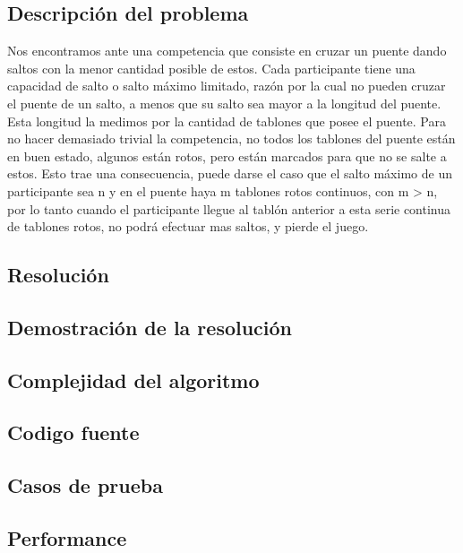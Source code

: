 \subsection{Descripci\'on del problema}

Nos encontramos ante una competencia que consiste en cruzar un puente dando saltos con la menor cantidad posible de estos.
Cada participante tiene una capacidad de salto o salto máximo limitado, razón por la cual no pueden cruzar el puente de un salto, a menos que su salto sea mayor a la longitud del puente. Esta longitud la medimos por la cantidad de tablones que posee el puente.
Para no hacer demasiado trivial la competencia, no todos los tablones del puente están en buen estado, algunos están rotos, pero están marcados para que no se salte a estos. Esto trae una consecuencia, puede darse el caso que el salto máximo de un participante sea n y en el puente haya m tablones rotos continuos, con m > n, por lo tanto cuando el participante llegue al tablón anterior a esta serie continua de tablones rotos, no podrá efectuar mas saltos, y pierde el juego. 

\subsection{Resoluci\'on}


\subsection{Demostraci\'on de la resoluci\'on}

\subsection{Complejidad del algoritmo}


\subsection{Codigo fuente}




\subsection{Casos de prueba}

\subsection{Performance}
